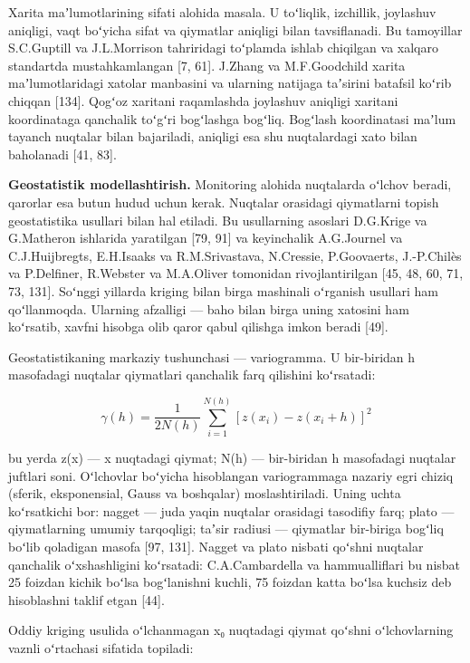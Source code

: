 Xarita maʼlumotlarining sifati alohida masala. U toʻliqlik, izchillik,
joylashuv aniqligi, vaqt boʻyicha sifat va qiymatlar aniqligi bilan
tavsiflanadi. Bu tamoyillar S.C.Guptill va J.L.Morrison tahriridagi
toʻplamda ishlab chiqilgan va xalqaro standartda mustahkamlangan {[}7,
61{]}. J.Zhang va M.F.Goodchild xarita maʼlumotlaridagi xatolar
manbasini va ularning natijaga taʼsirini batafsil koʻrib chiqqan
{[}134{]}. Qogʻoz xaritani raqamlashda joylashuv aniqligi xaritani
koordinataga qanchalik toʻgʻri bogʻlashga bogʻliq. Bogʻlash koordinatasi
maʼlum tayanch nuqtalar bilan bajariladi, aniqligi esa shu nuqtalardagi
xato bilan baholanadi {[}41, 83{]}.

\textbf{Geostatistik modellashtirish.} Monitoring alohida nuqtalarda
oʻlchov beradi, qarorlar esa butun hudud uchun kerak. Nuqtalar orasidagi
qiymatlarni topish geostatistika usullari bilan hal etiladi. Bu
usullarning asoslari D.G.Krige va G.Matheron ishlarida yaratilgan {[}79,
91{]} va keyinchalik A.G.Journel va C.J.Huijbregts, E.H.Isaaks va
R.M.Srivastava, N.Cressie, P.Goovaerts, J.-P.Chilès va P.Delfiner,
R.Webster va M.A.Oliver tomonidan rivojlantirilgan {[}45, 48, 60, 71,
73, 131{]}. Soʻnggi yillarda kriging bilan birga mashinali oʻrganish
usullari ham qoʻllanmoqda. Ularning afzalligi --- baho bilan birga uning
xatosini ham koʻrsatib, xavfni hisobga olib qaror qabul qilishga imkon
beradi {[}49{]}.

Geostatistikaning markaziy tushunchasi --- variogramma. U bir-biridan h
masofadagi nuqtalar qiymatlari qanchalik farq qilishini koʻrsatadi:

\begin{equation}\tag{1.3}
\gamma(h) = \frac{1}{2N(h)} \sum_{i=1}^{N(h)} \left[ z(x_i) - z(x_i + h) \right]^2
\end{equation}

bu yerda z(x) --- x nuqtadagi qiymat; N(h) --- bir-biridan h masofadagi
nuqtalar juftlari soni. Oʻlchovlar boʻyicha hisoblangan variogrammaga
nazariy egri chiziq (sferik, eksponensial, Gauss va boshqalar)
moslashtiriladi. Uning uchta koʻrsatkichi bor: nagget --- juda yaqin
nuqtalar orasidagi tasodifiy farq; plato --- qiymatlarning umumiy
tarqoqligi; taʼsir radiusi --- qiymatlar bir-biriga bogʻliq boʻlib
qoladigan masofa {[}97, 131{]}. Nagget va plato nisbati qoʻshni nuqtalar
qanchalik oʻxshashligini koʻrsatadi: C.A.Cambardella va hammualliflari
bu nisbat 25 foizdan kichik boʻlsa bogʻlanishni kuchli, 75 foizdan katta
boʻlsa kuchsiz deb hisoblashni taklif etgan {[}44{]}.

Oddiy kriging usulida oʻlchanmagan x₀ nuqtadagi qiymat qoʻshni
oʻlchovlarning vaznli oʻrtachasi sifatida topiladi:


